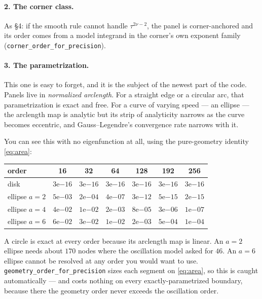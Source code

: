 \documentclass[11pt]{article}
\theoremstyle{definition}
\theoremstyle{remark}
\newcommand{\code}[1]{\texttt{#1}}
\begin{document}
\paragraph{2. The corner class.} As \S4: if the smooth rule cannot handle
$\tau^{2\nu-2}$, the panel is corner-anchored and its order comes from a model
integrand in the corner's own exponent family
(\code{corner\_order\_for\_precision}).

\paragraph{3. The parametrization.}\label{sec:geom} This one is easy to forget,
and it is the subject of the newest part of the code. Panels live in
\emph{normalized arclength}. For a straight edge or a circular arc, that
parametrization is exact and free. For a curve of varying speed --- an ellipse
--- the arclength map is analytic but its strip of analyticity narrows as the
curve becomes eccentric, and Gauss--Legendre's convergence rate narrows with it.

You can see this with no eigenfunction at all, using the pure-geometry identity
\eqref{eq:area}:

\begin{center}
\begin{tabular}{lcccccc}
\toprule
order & 16 & 32 & 64 & 128 & 192 & 256\\
\midrule
disk          & $3$e$-16$ & $3$e$-16$ & $3$e$-16$ & $3$e$-16$ & $3$e$-16$ & $3$e$-16$\\
ellipse $a=2$ & $5$e$-03$ & $2$e$-04$ & $4$e$-07$ & $3$e$-12$ & $5$e$-15$ & $2$e$-15$\\
ellipse $a=4$ & $4$e$-02$ & $1$e$-02$ & $2$e$-03$ & $8$e$-05$ & $3$e$-06$ & $1$e$-07$\\
ellipse $a=6$ & $6$e$-02$ & $3$e$-02$ & $1$e$-02$ & $2$e$-03$ & $5$e$-04$ & $1$e$-04$\\
\bottomrule
\end{tabular}
\end{center}

\medskip\noindent
A circle is exact at every order because its arclength map is linear. An
$a=2$ ellipse needs about $170$ nodes where the oscillation model asked for $46$.
An $a=6$ ellipse cannot be resolved at any order you would want to use.
\code{geometry\_order\_for\_precision} sizes each segment on
\eqref{eq:area}, so this is caught automatically --- and costs nothing on
every exactly-parametrized boundary, because there the geometry order never
exceeds the oscillation order.
\end{document}
